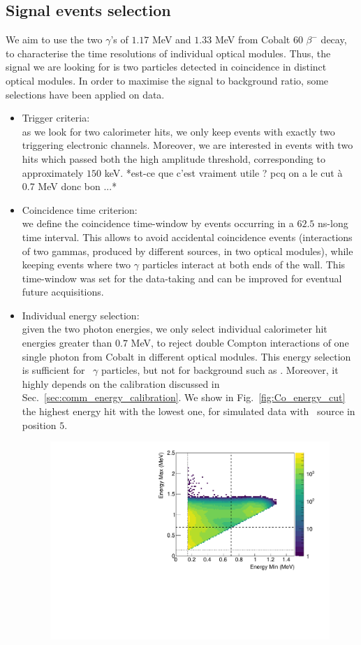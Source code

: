 \subsection{Signal events selection}
\label{subsec:Co_datacut}

We aim to use the two $\gamma$'s of $1.17$ MeV and $1.33$ MeV from Cobalt $60$ $\beta^{-}$ decay, to characterise the time resolutions of individual optical modules.
Thus, the signal we are looking for is two particles detected in coincidence in distinct optical modules.
In order to maximise the signal to background ratio, some selections have been applied on data.
\begin{itemize}
\item Trigger criteria:\\ as we look for two calorimeter hits, we only keep events with exactly two triggering electronic channels.
  Moreover, we are interested in events with two hits which passed both the high amplitude threshold, corresponding to approximately $150$ keV.
  *est-ce que c'est vraiment utile ? pcq on a le cut à 0.7 MeV donc bon ...*
\item Coincidence time criterion:\\ we define the coincidence time-window by events occurring in a $62.5$ ns-long time interval.
  This allows to avoid accidental coincidence events (interactions of two gammas, produced by different sources, in two optical modules), while keeping events where two $\gamma$ particles interact at both ends of the wall.
  This time-window was set for the data-taking and can be improved for eventual future acquisitions.
\item Individual energy selection:\\ given the two photon energies, we only select individual calorimeter hit energies greater than $0.7$ MeV, to reject double Compton interactions of one single photon from Cobalt in different optical modules.
  This energy selection is sufficient for \Co\ $\gamma$ particles, but not for background such as \Tl.
  Moreover, it highly depends on the calibration discussed in Sec.~\ref{sec:comm_energy_calibration}.
  We show in Fig.~\ref{fig:Co_energy_cut} the highest energy hit with the lowest one, for simulated data with \Co\ source in position $5$.
  \begin{figure}[h]
    \centering
    \includegraphics[width=14cm]{commissioning/fig_commissioning/Co_energy_cut.pdf}

\end{figure}
\end{itemize}
